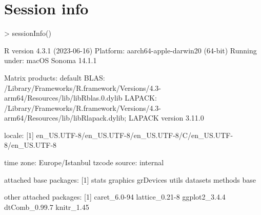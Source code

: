 \documentclass[10pt]{article}
\begin{document}
\section{Session info}
\begin{Schunk}
\begin{Sinput}
> sessionInfo()
\end{Sinput}
\begin{Soutput}
R version 4.3.1 (2023-06-16)
Platform: aarch64-apple-darwin20 (64-bit)
Running under: macOS Sonoma 14.1.1

Matrix products: default
BLAS:   /Library/Frameworks/R.framework/Versions/4.3-arm64/Resources/lib/libRblas.0.dylib 
LAPACK: /Library/Frameworks/R.framework/Versions/4.3-arm64/Resources/lib/libRlapack.dylib;  LAPACK version 3.11.0

locale:
[1] en_US.UTF-8/en_US.UTF-8/en_US.UTF-8/C/en_US.UTF-8/en_US.UTF-8

time zone: Europe/Istanbul
tzcode source: internal

attached base packages:
[1] stats     graphics  grDevices utils     datasets  methods   base     

other attached packages:
[1] caret_6.0-94   lattice_0.21-8 ggplot2_3.4.4  dtComb_0.99.7  knitr_1.45    


\end{Soutput}
\end{Schunk}
\end{document}
